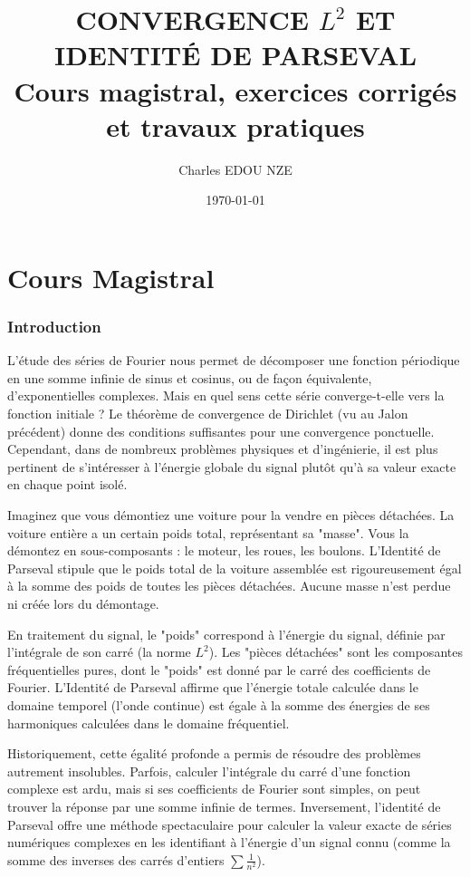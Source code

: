 \documentclass[11pt,a4paper]{article}
\title{\Huge CONVERGENCE $L^2$ ET IDENTITÉ DE PARSEVAL \\ \large Cours magistral, exercices corrigés et travaux pratiques}
\author{\Large Charles EDOU NZE}
\date{\today}
\begin{document}
\maketitle
\tableofcontents
\newpage

\part{Cours Magistral}



\section{Introduction}


L'étude des séries de Fourier nous permet de décomposer une fonction périodique en une somme infinie de sinus et cosinus, ou de façon équivalente, d'exponentielles complexes. Mais en quel sens cette série converge-t-elle vers la fonction initiale ? Le théorème de convergence de Dirichlet (vu au Jalon précédent) donne des conditions suffisantes pour une convergence ponctuelle. Cependant, dans de nombreux problèmes physiques et d'ingénierie, il est plus pertinent de s'intéresser à l'énergie globale du signal plutôt qu'à sa valeur exacte en chaque point isolé.

Imaginez que vous démontiez une voiture pour la vendre en pièces détachées. La voiture entière a un certain poids total, représentant sa "masse". Vous la démontez en sous-composants : le moteur, les roues, les boulons. L'Identité de Parseval stipule que le poids total de la voiture assemblée est rigoureusement égal à la somme des poids de toutes les pièces détachées. Aucune masse n'est perdue ni créée lors du démontage.

En traitement du signal, le "poids" correspond à l'énergie du signal, définie par l'intégrale de son carré (la norme $L^2$). Les "pièces détachées" sont les composantes fréquentielles pures, dont le "poids" est donné par le carré des coefficients de Fourier. L'Identité de Parseval affirme que l'énergie totale calculée dans le domaine temporel (l'onde continue) est égale à la somme des énergies de ses harmoniques calculées dans le domaine fréquentiel.

Historiquement, cette égalité profonde a permis de résoudre des problèmes autrement insolubles. Parfois, calculer l'intégrale du carré d'une fonction complexe est ardu, mais si ses coefficients de Fourier sont simples, on peut trouver la réponse par une somme infinie de termes. Inversement, l'identité de Parseval offre une méthode spectaculaire pour calculer la valeur exacte de séries numériques complexes en les identifiant à l'énergie d'un signal connu (comme la somme des inverses des carrés d'entiers $\sum \frac{1}{n^2}$).
\end{document}

